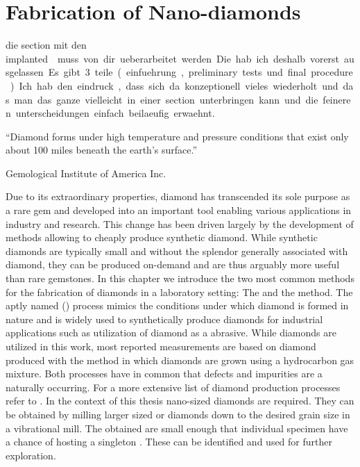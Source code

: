
\chapter{Fabrication of Nano-diamonds}	\label{ch::fabrication_nanodiamonds}

	\begin{remark}
			\item die section mit den \si implanted \nds muss von dir ueberarbeitet werden. Die hab ich deshalb vorerst ausgelassen. Es gibt 3 teile (einfuehrung, preliminary tests und final procedure). Ich hab den eindruck, dass sich da konzeptionell vieles wiederholt und das man das ganze vielleicht in einer section unterbringen kann und die feineren unterscheidungen einfach beilaeufig erwaehnt.
	\end{remark}

	\epigraph{``Diamond forms under high temperature and pressure conditions that exist only about 100 miles beneath the earth's surface.''}{\textup{Gemological Institute of America Inc.}}

	Due to its extraordinary properties, diamond has transcended its sole purpose as a rare gem and developed into an important tool enabling various applications in industry and research. This change has been driven largely by the development of methods allowing to cheaply produce synthetic diamond. While synthetic diamonds are typically small and without the splendor generally associated with diamond, they can be produced on-demand and are thus arguably more useful than rare gemstones.
	In this chapter we introduce the two most common methods for the fabrication of diamonds in a laboratory setting: The \hpht and the \cvd method.
	The aptly named \hpht (\HPHT) process mimics the conditions under which diamond is formed in nature and is widely used to synthetically produce diamonds for industrial applications such as utilization of diamond as a abrasive.
	While \HPHT diamonds are utilized in this work, most reported measurements are based on diamond produced with the \CVD method in which diamonds are grown using a hydrocarbon gas mixture. Both processes have in common that defects and impurities are a naturally occurring.
	For a more extensive list of diamond production processes refer to \cite{davis1993diamond}.
	In the context of this thesis nano-sized diamonds are required. They can be obtained by milling larger sized \HPHT or \CVD diamonds down to the desired grain size in a vibrational mill.
	The obtained \nds are small enough that individual specimen have a chance of hosting a singleton \siv. These can be identified and used for further exploration.

